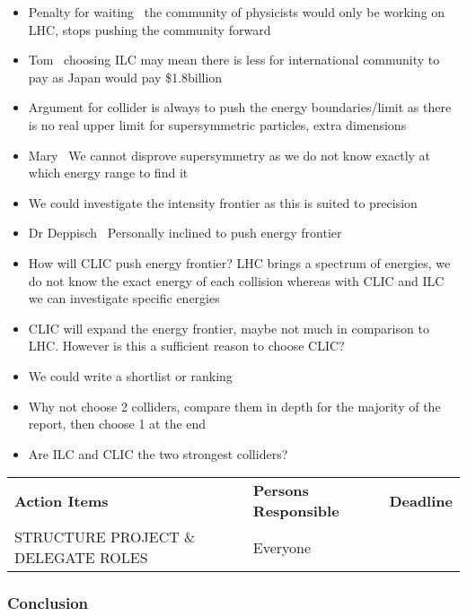 \begin{itemize}
\item Penalty for waiting  \textemdash \, the community of physicists would only be working on LHC, stops pushing the community forward
\item Tom  \textemdash \, choosing ILC may mean there is less for international community to pay as Japan would pay \$1.8billion
\item Argument for collider is always to push the energy boundaries/limit as there is no real upper limit for supersymmetric particles, extra dimensions
\item Mary  \textemdash \, We cannot disprove supersymmetry as we do not know exactly at which energy range to find it
\item We could investigate the intensity frontier as this is suited to precision
\item Dr Deppisch  \textemdash \, Personally inclined to push energy frontier
\item How will CLIC push energy frontier? LHC brings a spectrum of energies, we do not know the exact energy of each collision whereas with CLIC and ILC we can investigate specific energies
\item CLIC will expand the energy frontier, maybe not much in comparison to LHC. However is this a sufficient reason to choose CLIC?
\item We could write a shortlist or ranking
\item Why not choose 2 colliders, compare them in depth for the majority of the report, then choose 1 at the end
\item Are ILC and CLIC the two strongest colliders?
\end{itemize}

\begin{tabularx}{\textwidth}{X p{4.5cm} p{1.2cm}}
  \textbf{Action Items} & \textbf{Persons Responsible} & \textbf{Deadline} \\

STRUCTURE PROJECT \& DELEGATE ROLES
& Everyone &
 \\

\end{tabularx}

\subsubsection{Conclusion}

